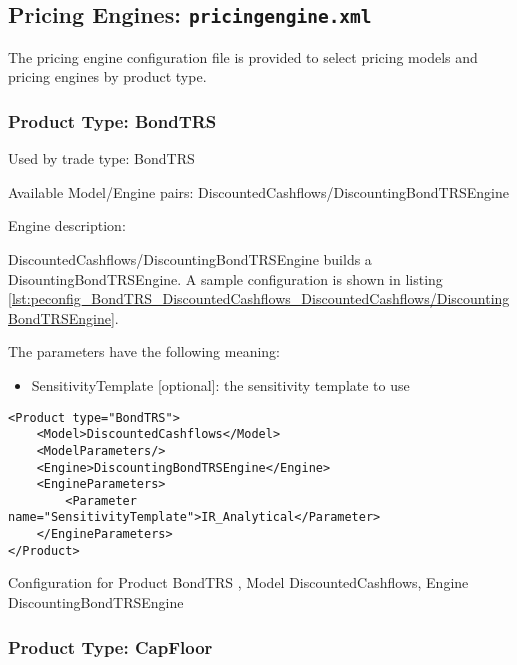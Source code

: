 \subsection{Pricing Engines: {\tt pricingengine.xml}}
\label{sec:configuration_pricingengines}

The pricing engine configuration file is provided to select pricing models and pricing engines by product type.

\subsubsection{Product Type: BondTRS}

Used by trade type: BondTRS

Available Model/Engine pairs: DiscountedCashflows/DiscountingBondTRSEngine

Engine description:

DiscountedCashflows/DiscountingBondTRSEngine builds a DisountingBondTRSEngine. A sample configuration is shown in listing \ref{lst:peconfig_BondTRS_DiscountedCashflows_DiscountedCashflows/DiscountingBondTRSEngine}.

The parameters have the following meaning:

\begin{itemize}
\item SensitivityTemplate [optional]: the sensitivity template to use 
\end{itemize}

\begin{longlisting}
\begin{verbatim}
<Product type="BondTRS">
    <Model>DiscountedCashflows</Model>
    <ModelParameters/>
    <Engine>DiscountingBondTRSEngine</Engine>
    <EngineParameters>
        <Parameter name="SensitivityTemplate">IR_Analytical</Parameter>
    </EngineParameters>
</Product>
\end{verbatim}
\caption{Configuration for Product BondTRS , Model DiscountedCashflows, Engine DiscountingBondTRSEngine}
\label{lst:peconfig_BondTRS_DiscountedCashflows_DiscountedCashflows/DiscountingBondTRSEngine}
\end{longlisting}

\subsubsection{Product Type: CapFloor}

